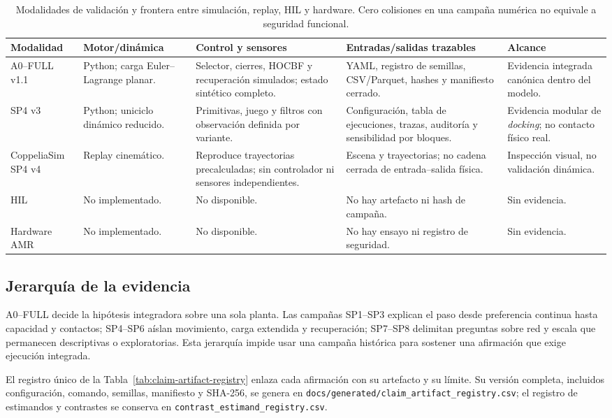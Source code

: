 \begin{table}[H]
\centering
\scriptsize
\begin{tabularx}{\textwidth}{@{}p{}p{}p{}p{}X@{}}
\toprule
Modalidad & Motor/dinámica & Control y sensores & Entradas/salidas trazables & Alcance \\
\midrule
A0--FULL v1.1 & Python; carga Euler--Lagrange planar. & Selector, cierres, HOCBF y recuperación simulados; estado sintético completo. & YAML, registro de semillas, CSV/Parquet, hashes y manifiesto cerrado. & Evidencia integrada canónica dentro del modelo. \\
SP4 v3 & Python; uniciclo dinámico reducido. & Primitivas, juego y filtros con observación definida por variante. & Configuración, tabla de ejecuciones, trazas, auditoría y sensibilidad por bloques. & Evidencia modular de \emph{docking}; no contacto físico real. \\
CoppeliaSim SP4 v4 & Replay cinemático. & Reproduce trayectorias precalculadas; sin controlador ni sensores independientes. & Escena y trayectorias; no cadena cerrada de entrada--salida física. & Inspección visual, no validación dinámica. \\
HIL & No implementado. & No disponible. & No hay artefacto ni hash de campaña. & Sin evidencia. \\
Hardware AMR & No implementado. & No disponible. & No hay ensayo ni registro de seguridad. & Sin evidencia. \\
\bottomrule
\end{tabularx}
\caption{Modalidades de validación y frontera entre simulación, replay, HIL y hardware. Cero colisiones en una campaña numérica no equivale a seguridad funcional.}
\label{tab:modalidades-validacion}
\end{table}
\subsection{Jerarquía de la evidencia}

A0--FULL decide la hipótesis integradora sobre una sola planta. Las campañas SP1--SP3 explican el paso desde preferencia continua hasta capacidad y contactos; SP4--SP6 aíslan movimiento, carga extendida y recuperación; SP7--SP8 delimitan preguntas sobre red y escala que permanecen descriptivas o exploratorias. Esta jerarquía impide usar una campaña histórica para sostener una afirmación que exige ejecución integrada.

El registro único de la Tabla~\ref{tab:claim-artifact-registry} enlaza cada afirmación con su artefacto y su límite. Su versión completa, incluidos configuración, comando, semillas, manifiesto y SHA-256, se genera en \texttt{docs/generated/claim\_artifact\_registry.csv}; el registro de estimandos y contrastes se conserva en \texttt{contrast\_estimand\_registry.csv}.


